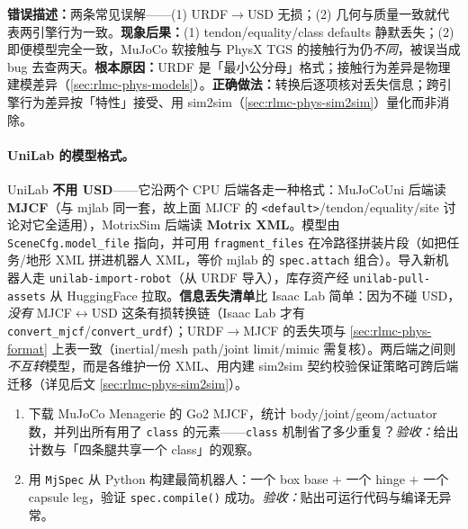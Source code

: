 \begin{pitfall}[假设 URDF$\to$USD 转换无损 / 认为「模型相同 $=$ 行为相同」]
\textbf{错误描述：}两条常见误解——(1) URDF$\to$USD 无损；(2) 几何与质量一致就代表两引擎行为一致。\textbf{现象后果：}(1) tendon/equality/class defaults 静默丢失；(2) 即便模型完全一致，MuJoCo 软接触与 PhysX TGS 的接触行为仍\emph{不同}，被误当成 bug 去查两天。\textbf{根本原因：}URDF 是「最小公分母」格式；接触行为差异是物理建模差异（\cref{sec:rlmc-phys-models}）。\textbf{正确做法：}转换后逐项核对丢失信息；跨引擎行为差异按「特性」接受、用 sim2sim（\cref{sec:rlmc-phys-sim2sim}）量化而非消除。
\end{pitfall}

\paragraph{UniLab 的模型格式。}UniLab \textbf{不用 USD}——它沿两个 CPU 后端各走一种格式：MuJoCoUni 后端读 \textbf{MJCF}（与 mjlab 同一套，故上面 MJCF 的 \verb|<default>|/tendon/equality/site 讨论对它全适用），MotrixSim 后端读 \textbf{Motrix XML}。模型由 \verb|SceneCfg.model_file| 指向，并可用 \verb|fragment_files| 在冷路径拼装片段（如把任务/地形 XML 拼进机器人 XML，等价 mjlab 的 \verb|spec.attach| 组合）。导入新机器人走 \verb|unilab-import-robot|（从 URDF 导入），库存资产经 \verb|unilab-pull-assets| 从 HuggingFace 拉取。\textbf{信息丢失清单}比 Isaac Lab 简单：因为不碰 USD，\emph{没有} MJCF$\leftrightarrow$USD 这条有损转换链（Isaac Lab 才有 \verb|convert_mjcf|/\verb|convert_urdf|）；URDF$\to$MJCF 的丢失项与 \cref{sec:rlmc-phys-format} 上表一致（inertial/mesh path/joint limit/mimic 需复核）。两后端之间则\emph{不互转}模型，而是各维护一份 XML、用内建 sim2sim 契约校验保证策略可跨后端迁移（详见后文 \cref{sec:rlmc-phys-sim2sim}）。

\begin{practice}[本节练习]
\begin{enumerate}
  \item 下载 MuJoCo Menagerie 的 Go2 MJCF，统计 body/joint/geom/actuator 数，并列出所有用了 \verb|class| 的元素——\verb|class| 机制省了多少重复？\emph{验收：}给出计数与「四条腿共享一个 class」的观察。
  \item 用 \verb|MjSpec| 从 Python 构建最简机器人：一个 box base $+$ 一个 hinge $+$ 一个 capsule leg，验证 \verb|spec.compile()| 成功。\emph{验收：}贴出可运行代码与编译无异常。
\end{enumerate}
\end{practice}

